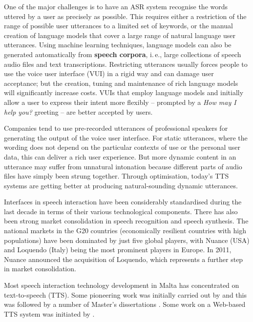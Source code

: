 \begin{multicols}{2}
One of the major challenges is to have an ASR system recognise the words uttered by a user as precisely as possible. This requires either a restriction of the range of possible user utterances to a limited set of keywords, or the manual creation of language models that cover a large range of natural language user utterances. Using machine learning techniques, language models can also be generated automatically from \textbf{speech corpora}, i.\,e., large collections of speech audio files and text transcriptions. Restricting utterances usually forces people to use the voice user interface (VUI) in a rigid way and can damage user acceptance; but the creation, tuning and maintenance of rich language models will significantly increase costs. VUIs that employ language models and initially allow a user to express their intent more flexibly -- prompted by a \textit{How may I help you?} greeting -- are better accepted by users.

Companies tend to use pre-recorded utterances of professional speakers for generating the output of the voice user interface. For static utterances, where the wording does not depend on the particular contexts of use or the personal user data, this can deliver a rich user experience. But more dynamic content in an utterance may suffer from unnatural intonation because different parts of audio files have simply been strung together. Through optimisation, today’s TTS systems are getting better at producing natural-sounding dynamic utterances.


Interfaces in speech interaction have been considerably standardised during the last decade in terms of their various technological components. There has also been strong market consolidation in speech recognition and speech synthesis. The national markets in the G20 countries (economically resilient countries with high populations) have been dominated by just five global players, with Nuance (USA) and Loquendo (Italy) being the most prominent players in Europe. In 2011, Nuance announced the acquisition of Loquendo, which represents a further step in market consolidation.

Most speech interaction technology development in Malta has concentrated on text-to-speech (TTS). Some pioneering work was initially carried out by \cite{Micallef:1997} and this was followed by a number of Master’s dissertations \cite{Farrugia:2005}. Some work on a Web-based TTS system was initiated by \cite{Buhagiar-Micallef:2008}.


\end{multicols}

